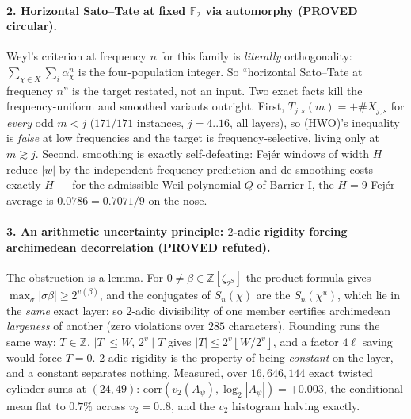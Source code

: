 \documentclass[10pt]{article}
\theoremstyle{plain}
\theoremstyle{definition}
\newcommand{\F}{\mathbb F}
\newcommand{\Z}{\mathbb Z}
\newcommand{\flr}[1]{\left\lfloor #1\right\rfloor}
\newcommand{\proved}{\textcolor{proved}{\textsf{\textbf{\footnotesize PROVED}}}}
\begin{document}
\paragraph{2. Horizontal Sato--Tate at fixed $\F_2$ via automorphy
(\proved{} circular).} Weyl's criterion at frequency $n$ for this family is
\emph{literally} orthogonality: $\sum_{\chi\in X}\sum_i\alpha_\chi^n$ is the
four-population integer. So ``horizontal Sato--Tate at frequency $n$'' is the
target restated, not an input. Two exact facts kill the frequency-uniform and
smoothed variants outright. First, $T_{j,s}(m)=+\#X_{j,s}$ for \emph{every} odd
$m<j$ ($171/171$ instances, $j=4..16$, all layers), so (HWO)'s inequality is
\emph{false} at low frequencies and the target is frequency-selective, living
only at $m\gtrsim j$. Second, smoothing is exactly self-defeating: Fej\'er
windows of width $H$ reduce $|w|$ by the independent-frequency prediction and
de-smoothing costs exactly $H$ --- for the admissible Weil polynomial $Q$ of
Barrier I, the $H=9$ Fej\'er average is $0.0786=0.7071/9$ on the nose.

\paragraph{3. An arithmetic uncertainty principle: $2$-adic rigidity forcing
archimedean decorrelation (\proved{} refuted).} The obstruction is a lemma. For
$0\ne\beta\in\Z[\zeta_{2^S}]$ the product formula gives
$\max_\sigma|\sigma\beta|\ge2^{v(\beta)}$, and the conjugates of $S_n(\chi)$ are
the $S_n(\chi^u)$, which lie in the \emph{same} exact layer: so $2$-adic
divisibility of one member certifies archimedean \emph{largeness} of another
(zero violations over $285$ characters). Rounding runs the same way: $T\in\Z$,
$|T|\le W$, $2^v\mid T$ gives $|T|\le2^v\flr{W/2^v}$, and a factor $4\ell$
saving would force $T=0$. $2$-adic rigidity is the property of being
\emph{constant} on the layer, and a constant separates nothing. Measured, over
$16{,}646{,}144$ exact twisted cylinder sums at $(24,49)$:
$\mathrm{corr}(v_2(A_\psi),\log_2|A_\psi|)=+0.003$, the conditional mean flat to
$0.7\%$ across $v_2=0..8$, and the $v_2$ histogram halving exactly.
\end{document}
